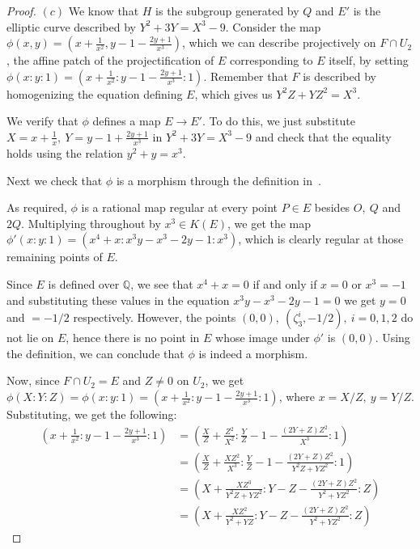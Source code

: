\documentclass{article}
\newcommand{\numberset}{\mathbb}
\newcommand{\Q}{\numberset{Q}}
\begin{document}
\begin{proof}
    $(c)$ We know that $H$ is the subgroup generated by $Q$ and $E'$ is the
    elliptic curve described by $Y^2+3Y=X^3-9$. Consider the map
    $\phi(x,y)=(x+\frac{1}{x^2},y-1-\frac{2y+1}{x^3})$, which we can describe
    projectively on $F\cap U_2$, the affine patch of the projectification of $E$
    corresponding to $E$ itself, by setting
    $\phi(x:y:1)=(x+\frac{1}{x^2}:y-1-\frac{2y+1}{x^3}:1)$. Remember that $F$ is
    described by homogenizing the equation defining $E$, which gives us
    $Y^2Z+YZ^2=X^3$.

    We verify that $\phi$ defines a map $E\rightarrow E'$. To do this,
    we just substitute $X=x+\frac{1}{x},\ Y=y-1+\frac{2y+1}{x^3}$ in
    $Y^2+3Y=X^3-9$ and check that the equality holds using the relation
    $y^2+y=x^3$.

    Next we check that $\phi$ is a morphism through the definition in~\cite[p.
    12]{Sil09}.

    As required, $\phi$ is a rational map regular at every point $P\in E$
    besides $O,\ Q$ and $2Q$. Multiplying throughout by $x^3\in
    K(E)$, we get the map $\phi'(x:y:1)=(x^4+x:x^3y-x^3-2y-1:x^3)$, which is clearly
    regular at those remaining points of $E$.

    Since $E$ is defined over $\Q$, we see that $x^4+x=0$ if and only if $x=0$
    or $x^3=-1$ and substituting these values in the equation $x^3y-x^3-2y-1=0$
    we get $y=0$ and $=-1/2$ respectively. However, the points $(0,0),\
    (\zeta^i_3,-1/2),\ i=0,1,2$ do not lie on $E$, hence there is no point in
    $E$ whose image under $\phi'$ is $(0,0)$. Using the definition, we can
    conclude that $\phi$ is indeed a morphism.

    Now, since $F\cap U_2=E$ and $Z\neq 0$ on $U_2$, we get
    $\phi(X:Y:Z)=\phi(x:y:1)=(x+\frac{1}{x^2}:y-1-\frac{2y+1}{x^3}:1)$, where
    $x=X/Z,\ y=Y/Z$. Substituting, we get the following:
    \begin{align*}
        \left(x+\frac{1}{x^2}:y-1-\frac{2y+1}{x^3}:1\right) &=
        \left(\frac{X}{Z}+\frac{Z^2}{X^2}:\frac{Y}{Z}-1-\frac{(2Y+Z)Z^2}{X^3}:1\right) \\
        &=
        \left(\frac{X}{Z}+\frac{XZ^2}{X^3}:\frac{Y}{Z}-1-\frac{(2Y+Z)Z^2}{Y^2Z+YZ^2}:1\right)
        \\
        &=
        \left(X+\frac{XZ^3}{Y^2Z+YZ^2}:Y-Z-\frac{(2Y+Z)Z^2}{Y^2+YZ^2}:Z\right) \\
        &= \left(X+\frac{XZ^2}{Y^2+YZ}:Y-Z-\frac{(2Y+Z)Z^2}{Y^2+YZ^2}:Z\right)
    \end{align*}


\end{proof}
\end{document}
